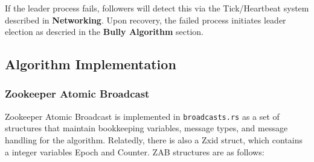 \documentclass{article}
\begin{document}
        If the leader process fails, followers will detect this via the Tick/Heartbeat system described in \textbf{Networking}. Upon recovery, the failed process initiates leader election as descried in the \textbf{Bully Algorithm} section. 

\subsection*{Algorithm Implementation}
    \subsubsection*{Zookeeper Atomic Broadcast}
    Zookeeper Atomic Broadcast is implemented in \verb|broadcasts.rs| as a set of structures that maintain bookkeeping variables, message types, and message handling for the algorithm. Relatedly, there is also a Zxid struct, which contains a integer variables Epoch and Counter. ZAB structures are as follows:
\end{document}
